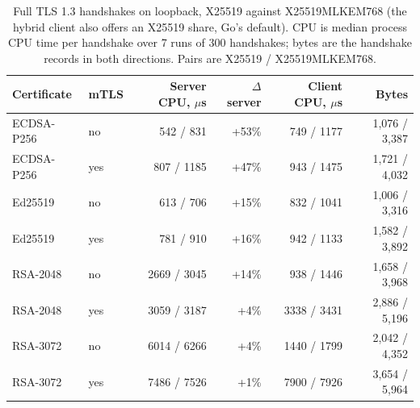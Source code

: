 \begin{table}[t]
\centering
\caption{Full TLS 1.3 handshakes on loopback, X25519 against X25519MLKEM768 (the hybrid client also offers an X25519 share, Go's default). CPU is median process CPU time per handshake over 7 runs of 300 handshakes; bytes are the handshake records in both directions. Pairs are X25519 / X25519MLKEM768.}
\label{tab:hs}
\small
\begin{tabular}{llrrrr}
\toprule
Certificate & mTLS & Server CPU, $\mu$s & $\Delta$ server & Client CPU, $\mu$s & Bytes \\
\midrule
ECDSA-P256 & no & 542 / 831 & +53\% & 749 / 1177 & 1,076 / 3,387 \\
ECDSA-P256 & yes & 807 / 1185 & +47\% & 943 / 1475 & 1,721 / 4,032 \\
Ed25519 & no & 613 / 706 & +15\% & 832 / 1041 & 1,006 / 3,316 \\
Ed25519 & yes & 781 / 910 & +16\% & 942 / 1133 & 1,582 / 3,892 \\
RSA-2048 & no & 2669 / 3045 & +14\% & 938 / 1446 & 1,658 / 3,968 \\
RSA-2048 & yes & 3059 / 3187 & +4\% & 3338 / 3431 & 2,886 / 5,196 \\
RSA-3072 & no & 6014 / 6266 & +4\% & 1440 / 1799 & 2,042 / 4,352 \\
RSA-3072 & yes & 7486 / 7526 & +1\% & 7900 / 7926 & 3,654 / 5,964 \\
\bottomrule
\end{tabular}
\end{table}
